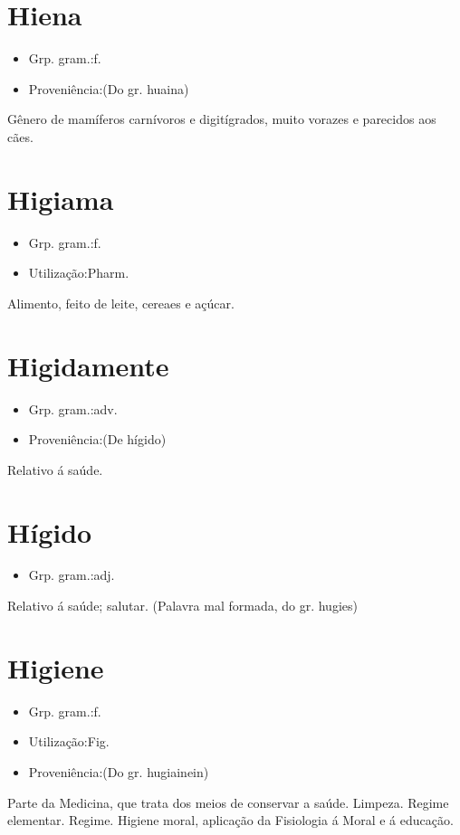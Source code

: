 \documentclass{article}
\begin{document}
\section{Hiena}
\begin{itemize}
\item {Grp. gram.:f.}
\end{itemize}
\begin{itemize}
\item {Proveniência:(Do gr. \textunderscore huaina\textunderscore )}
\end{itemize}
Gênero de mamíferos carnívoros e digitígrados, muito vorazes e parecidos aos cães.
\section{Higiama}
\begin{itemize}
\item {Grp. gram.:f.}
\end{itemize}
\begin{itemize}
\item {Utilização:Pharm.}
\end{itemize}
Alimento, feito de leite, cereaes e açúcar.
\section{Higidamente}
\begin{itemize}
\item {Grp. gram.:adv.}
\end{itemize}
\begin{itemize}
\item {Proveniência:(De \textunderscore hígido\textunderscore )}
\end{itemize}
Relativo á saúde.
\section{Hígido}
\begin{itemize}
\item {Grp. gram.:adj.}
\end{itemize}
Relativo á saúde; salutar.
(Palavra mal formada, do gr. \textunderscore hugies\textunderscore )
\section{Higiene}
\begin{itemize}
\item {Grp. gram.:f.}
\end{itemize}
\begin{itemize}
\item {Utilização:Fig.}
\end{itemize}
\begin{itemize}
\item {Proveniência:(Do gr. \textunderscore hugiainein\textunderscore )}
\end{itemize}
Parte da Medicina, que trata dos meios de conservar a saúde.
Limpeza.
Regime elementar.
Regime.
\textunderscore Higiene moral\textunderscore , aplicação da Fisiologia á Moral e á educação.
\end{document}
